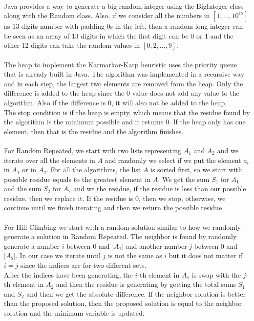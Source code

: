 \documentclass[tikz, 12pt]{scrartcl}
\begin{document}
\\
Java provides a way to generate a big random integer using the BigInteger class along with the Random class. Also, if we consider all the numbers in $[1, \ldots, 10^{12}]$ as 13 digits number with padding 0s in the left, then a random long integer can be seen as an array of 13 digits in which the first digit can be 0 or 1 and the other 12 digits can take the random values in $[0, 2, \ldots, 9]$.\\
\\
The heap to implement the Karmarkar-Karp heuristic uses the priority queue that is already built in Java. The algorithm was implemented in a recursive way and in each step, the largest two elements are removed from the heap. Only the difference is added to the heap since the 0 value does not add any value to the algorithm. Also if the difference is 0, it will also not be added to the heap.\\
The stop condition is if the heap is empty, which means that the residue found by the algorithm is the minimum possible and it returns 0. If the heap only has one element, then that is the residue and the algorithm finishes.\\
\\
For Random Repeated, we start with two lists  representing $A_1$ and $A_2$ and we iterate over all the elements in $A$ and randomly we select if we put the element $a_i$ in $A_1$ or in $A_2$. For all the algorithms, the list $A$ is sorted first, so we start with possible residue equals to the greatest element in $A$. We get the sum $S_1$ for $A_1$ and the sum $S_2$ for $A_2$ and we the residue, if the residue is less than our possible residue, then we replace it. If the residue is 0, then we stop, otherwise, we continue until we finish iterating and then we return the possible residue.\\
\\
For Hill Climbing we start with a random solution similar to how we randomly generate a solution in Random Repeated. The neighbor is found by randomly generate a number $i$ between 0 and $|A_1|$ and another number $j$ between 0 and $|A_2|$. In our case we iterate until $j$ is not the same as $i$ but it does not matter if $i = j$ since the indices are for two different sets. \\
After the indices have been generating, the $i$-th element in $A_1$ is swap with the $j$-th element in $A_2$ and then the residue is generating by getting the total sums $S_1$ and $S_2$ and then we get the absolute difference. If the neighbor solution is better than the proposed solution, then the proposed solution is equal to the neighbor solution and the minimum variable is updated.\\
\end{document}
